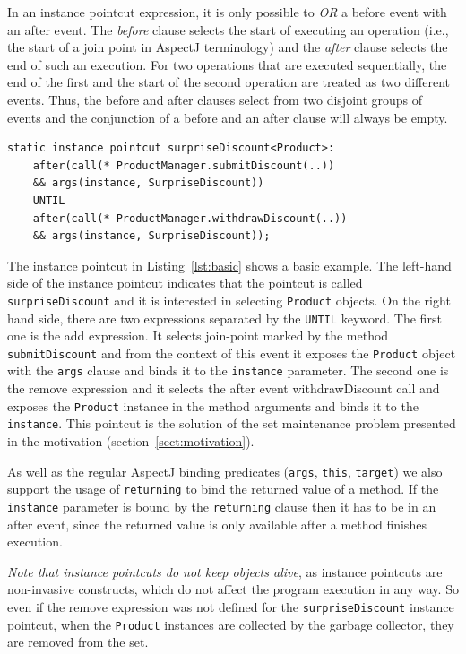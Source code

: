 \documentclass{acm_proc_article-sp}
\newcommand{\lstinln}[1]{\lstinline~#1~}
\begin{document}
In an instance pointcut expression, it is only possible to \emph{OR} a before event with an after event. 
The \emph{before} clause selects the start of executing an operation (i.e., the start of a join point in AspectJ terminology) and the \emph{after} clause selects the end of such an execution. 
For two operations that are executed sequentially, the end of the first and the start of the second operation are treated as two different events. Thus, the before and after clauses select from two disjoint groups of events and the conjunction of a before and an after clause will always be empty.

\begin{lstlisting}[float=h!, caption={A basic instance pointcut declaration with add and remove expressions}, label={lst:basic}]
static instance pointcut surpriseDiscount<Product>: 
	after(call(* ProductManager.submitDiscount(..)) 
	&& args(instance, SurpriseDiscount)) 
	UNTIL 
	after(call(* ProductManager.withdrawDiscount(..)) 
	&& args(instance, SurpriseDiscount));
\end{lstlisting}

The instance pointcut in Listing~\ref{lst:basic} shows a basic example. The left-hand side of the instance pointcut indicates that the pointcut is called \lstinln{surpriseDiscount} and it is interested in selecting \lstinln{Product} objects. 
On the right hand side, there are two expressions separated by the \lstinln{UNTIL} keyword. The first one is the add expression. It selects join-point marked by the method \lstinln{submitDiscount} and from the context of this event it exposes the \lstinln{Product} object with the \lstinln{args} clause and binds it to the \lstinln{instance} parameter. 
The second one is the remove expression and it selects the after event \textsf{withdrawDiscount} call and exposes the \lstinln{Product} instance in the method arguments and binds it to the \lstinln{instance}.
This pointcut is the solution of the set maintenance problem presented in the motivation (section~\ref{sect:motivation}).
 
As well as the regular AspectJ binding predicates (\lstinln{args}, \lstinln{this}, \lstinln{target}) we also support the usage of \lstinln{returning} to bind the returned value of a method. 
If the \lstinln{instance} parameter is bound by the \lstinln{returning} clause then it has to be in an after event, since the returned value is only available after a method finishes execution. 

\emph{Note that instance pointcuts do not keep objects alive}, as instance pointcuts are non-invasive constructs, which do not affect the program execution in any way. So even if the remove expression was not defined for the \lstinln{surpriseDiscount} instance pointcut, when the \lstinln{Product} instances are collected by the garbage collector, they are removed from the set. 
\end{document}
